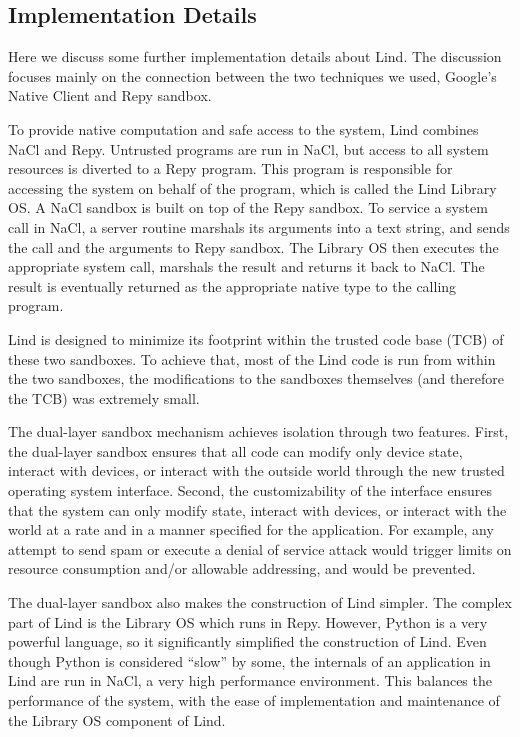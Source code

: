 \subsection{Implementation Details}
Here we discuss some further implementation details about Lind. 
The discussion focuses mainly on the connection between the two techniques we used, 
Google's Native Client and Repy sandbox. 

To provide native computation and safe access to the system, Lind combines NaCl and Repy. 
Untrusted programs are run in NaCl, but access to all system resources is diverted to a Repy program. 
This program is responsible for accessing the system on behalf of the program, which is called the Lind Library OS. 
A NaCl sandbox is built on top of the Repy sandbox. To service a system call in NaCl, a server routine 
marshals its arguments into a text string, and sends the call and the arguments to Repy sandbox. 
The Library OS then executes the appropriate system call, marshals the result and returns it back to NaCl. 
The result is eventually returned as the appropriate native type to the calling program. 

Lind is designed to minimize its footprint within the trusted code base (TCB) of these two sandboxes. 
To achieve that, most of the Lind code is run from within the two sandboxes, the modifications to 
the sandboxes themselves (and therefore the TCB) was extremely small. 

The dual-layer sandbox mechanism achieves isolation through 
two features. First, the dual-layer sandbox ensures that all code can modify only device state, 
interact with devices, or interact with the outside world through the new trusted operating system interface. 
Second, the customizability of the interface ensures that the system can only modify state, interact with 
devices, or interact with the world at a rate and in a manner specified for the application. For example, 
any attempt to send spam or execute a denial of service attack would trigger limits on resource 
consumption and/or allowable addressing, and would be prevented. 

The dual-layer sandbox also makes the construction of Lind simpler. The complex part of Lind is the 
Library OS which runs in Repy. However, Python is a very powerful language, so it significantly simplified 
the construction of Lind. Even though Python is considered ``slow'' by some, the internals of 
an application in Lind are run in NaCl, a very high performance environment. 
This balances the performance of the system, with the ease of implementation and maintenance 
of the Library OS component of Lind. 

